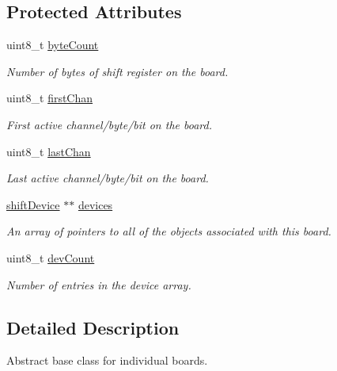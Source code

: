 \subsection*{Protected Attributes}
\begin{DoxyCompactItemize}
\item 
uint8\_\-t \hyperlink{classshift_board_a814955fb002a8aa0218052c7adc130ea}{byteCount}
\begin{DoxyCompactList}\small\item\em Number of bytes of shift register on the board. \item\end{DoxyCompactList}\item 
uint8\_\-t \hyperlink{classshift_board_abdbf7eaef6353a2ffddbf69753a82ef2}{firstChan}
\begin{DoxyCompactList}\small\item\em First active channel/byte/bit on the board. \item\end{DoxyCompactList}\item 
uint8\_\-t \hyperlink{classshift_board_a61a3f53b408a4165d38b613efd2b4d5e}{lastChan}
\begin{DoxyCompactList}\small\item\em Last active channel/byte/bit on the board. \item\end{DoxyCompactList}\item 
\hyperlink{classshift_device}{shiftDevice} $\ast$$\ast$ \hyperlink{classshift_board_a07a2549714f7064fa5e48ec63fdb5efb}{devices}
\begin{DoxyCompactList}\small\item\em An array of pointers to all of the objects associated with this board. \item\end{DoxyCompactList}\item 
uint8\_\-t \hyperlink{classshift_board_ae7bba07850ced1219dcf67cab33de929}{devCount}
\begin{DoxyCompactList}\small\item\em Number of entries in the device array. \item\end{DoxyCompactList}\end{DoxyCompactItemize}


\subsection{Detailed Description}
Abstract base class for individual boards. 


